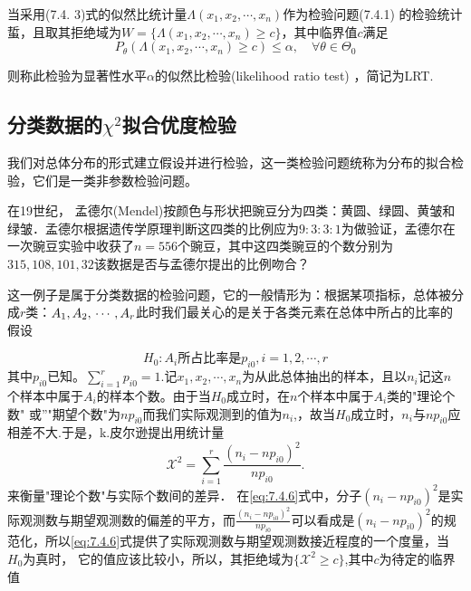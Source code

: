 \begin{definition}
    当采用(7.4. 3)式的似然比统计量$\Lambda(x_{1},x_{2},\cdots,x_{n})$作为检验问题(7.4.1) 的检验统计蜇，且取其拒绝域为$W=\{\Lambda(x_1,x_2,\cdots,x_n)\geq c\}$，其中临界值$c$满足
    \begin{equation}
        P_{\theta}(\Lambda(x_{1},x_{2},\cdots,x_{n})\geq c) \leq \alpha,\quad \forall \theta \in \Theta_0
    \end{equation}
\end{definition}
则称此检验为显著性水平$\alpha$的似然比检验(likelihood ratio test) ，简记为LRT.
\subsection{分类数据的\texorpdfstring{$ \chi^2$}{χ2}拟合优度检验}
我们对总体分布的形式建立假设并进行检验，这一类检验问题统称为分布的拟合检验，它们是一类非参数检验问题。

\begin{example}
    在19世纪， 孟德尔(Mendel)按颜色与形状把豌豆分为四类：黄圆、绿圆、黄皱和绿皱．孟德尔根据遗传学原理判断这四类的比例应为$9:3:3:1$为做验证，孟德尔在一次豌豆实验中收获了$n= 556$个豌豆，其中这四类豌豆的个数分别为$315,108,101,32$该数据是否与孟德尔提出的比例吻合？
\end{example}
这一例子是属于分类数据的检验问题，它的一般情形为：根据某项指标，总体被分成$r$类：$A_1,A_2,\\ \cdots,A_r$此时我们最关心的是关于各类元素在总体中所占的比率的假设

\begin{equation}
    \label{eq:7.4.5}
    H_0:A_i \text{所占比率是}p_{i0},i=1,2,\cdots,r
\end{equation}
其中$p_{i0}$已知。$\sum_{i=1}^{r} p_{i0}=1$.记$x_1,x_2,\cdots,x_n$为从此总体抽出的样本，且以$n_i$记这$n$个样本中属于$A_i$的样本个数。由于当$H_0$成立时，在$n$个样本中属于$A_i$类的"理论个数"
或”"期望个数"为$np_{i0}$而我们实际观测到的值为$n_i$,，故当$H_0$成立时，$n_i$与$np_{i0}$应相差不大.于是，k.皮尔逊提出用统计量
\begin{equation}
    \label{eq:7.4.6}
    {\mathcal X}^{2}=\sum_{i=1}^{r}\frac{(n_{i}-np_{i0})^2}{np_{i0}}.
\end{equation}
来衡量"理论个数"与实际个数间的差异．
在\eqref{eq:7.4.6}式中，分子$(n_{i}-np_{i0})^2$是实际观测数与期望观测数的偏差的平方，而$\frac{(n_{i}-np_{i0})^2}{np_{i0}}$可以看成是$(n_{i}-np_{i0})^2$的规范化，所以\eqref{eq:7.4.6}式提供了实际观测数与期望观测数接近程度的一个度量，当$H_0$为真时， 它的值应该比较小，所以，其拒绝域为$\{{\mathcal X}^{2} \geq c\}$,其中$c$为待定的临界值

